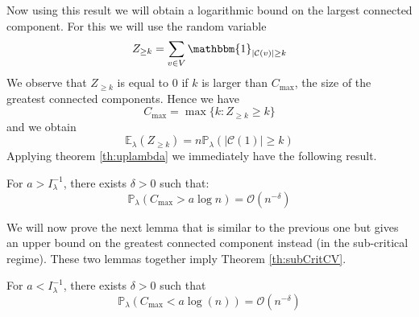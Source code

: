 Now using this result we will obtain a logarithmic bound on the largest connected component.
\newline
For this we will use the random variable 
\begin{equation}
	Z_{\geq k } = \sum_{v \in V} \mathbbm{1}_{|\mathcal{C}(v)| \geq k}
\end{equation}
We observe that $Z_{\geq k}$ is equal to 0 if $k$ is larger than $C_{\max}$, the size of the greatest connected components. Hence we have
\begin{equation}
	C_{\max} = \max\{k: Z_{\geq k} \geq k\}
\end{equation}
and we obtain 
\begin{equation}\label{eq:nexplambda}
	\mathbb{E}_{\lambda}(Z_{\geq k}) = n \mathbb{P}_{\lambda}(|\mathcal{C}(1)| \geq k)
\end{equation}
Applying theorem \ref{th:uplambda} we immediately have the following result.
\begin{lemma}\label{lemmalambdainf}
	For $a>I_{\lambda}^{-1}$, there exists $\delta > 0$ such that:
	\begin{equation}
		\mathbb{P}_{\lambda}(C_{\max} > a \log n) = \mathcal{O}(n^{-\delta}) 
	\end{equation}
\end{lemma}
We will now prove the next lemma that is similar to the previous one but gives an upper bound on the greatest connected component instead (in the sub-critical regime).
These two lemmas together imply Theorem \ref{th:subCritCV}.
\begin{lemma}\label{lemmalambdasup}
	For $a<I_{\lambda}^{-1}$, there exists $\delta >0$ such that
	\begin{equation}
		\mathbb{P}_{\lambda}(C_{\max} < a\log(n)) = \mathcal{O}(n^{-\delta})
	\end{equation}
\end{lemma}
